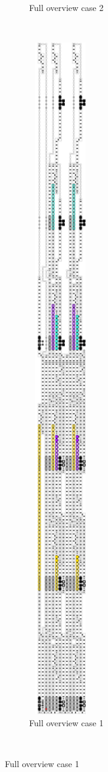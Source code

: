 \begin{figure}[H]
\begin{subfigure}[t]{0.3\textwidth}
            \caption{\label{fig:full_overview_case2_colored} Full overview case 2}
        \end{subfigure}%
        ~
        \begin{subfigure}[t]{0.3\textwidth}
            \centering
            \includegraphics[width=0.3\textwidth]{full_overview_case1_colored}
            \caption{\label{fig:full_overview_case1_colored} Full overview case 1}
        \end{subfigure}%
        ~
    \end{figure}